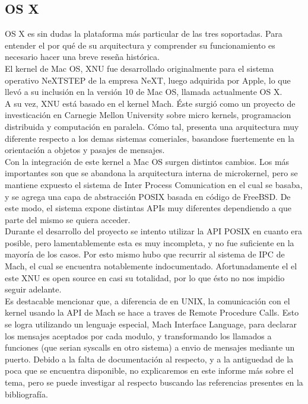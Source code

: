\subsection{OS X}

OS X es sin dudas la plataforma más particular de las tres soportadas. Para
entender el por qué de su arquitectura y comprender su funcionamiento es
necesario hacer una breve reseña histórica.\\

El kernel de Mac OS, XNU fue desarrollado originalmente para el sistema
operativo NeXTSTEP de la empresa NeXT, luego adquirida por Apple, lo que llevó
a su inclusión en la versión 10 de Mac OS, llamada actualmente OS X.\\

A su vez, XNU está basado en el kernel Mach. Éste surgió como un proyecto de
investicación en Carnegie Mellon University sobre micro kernels, programacion
distribuida y computación en paralela. Cómo tal, presenta una arquitectura muy
diferente respecto a los demas sistemas comeriales, basandose fuertemente en la
orientación a objetos y pasajes de mensajes.\\

Con la integración de este kernel a Mac OS surgen distintos cambios. Los más
importantes son que se abandona la arquitectura interna de microkernel, pero se
mantiene expuesto el sistema de Inter Process Comunication en el cual se
basaba, y se agrega una capa de abstracción POSIX basada en código de FreeBSD.
De este modo, el sistema expone distintas APIs muy diferentes dependiendo a que
parte del mismo se quiera acceder.\\

Durante el desarrollo del proyecto se intento utilizar la API POSIX en cuanto
era posible, pero lamentablemente esta es muy incompleta, y no fue suficiente
en la mayoría de los casos. Por esto mismo hubo que recurrir al sistema de IPC
de Mach, el cual se encuentra notablemente indocumentado. Afortunadamente el el
este XNU es open source en casi su totalidad, por lo que ésto no nos impidio
seguir adelante.\\

Es destacable mencionar que, a diferencia de en UNIX, la comunicación con el
kernel usando la API de Mach se hace a traves de Remote Procedure Calls. Esto
se logra utilizando un lenguaje especial, Mach Interface Language, para
declarar los mensajes aceptados por cada modulo, y transformando los llamados a
funciones (que serian syscalls en otro sistema) a envio de mensajes mediante un
puerto.  Debido a la falta de documentación al respecto, y a la antiguedad de
la poca que se encuentra disponible, no explicaremos en este informe más sobre
el tema, pero se puede investigar al respecto buscando las referencias
presentes en la bibliografía.\\

